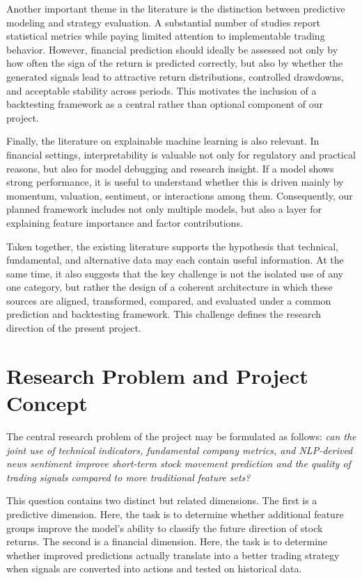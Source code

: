 \documentclass[12pt,a4paper]{article}
\begin{document}
Another important theme in the literature is the distinction between predictive modeling and strategy evaluation. A substantial number of studies report statistical metrics while paying limited attention to implementable trading behavior. However, financial prediction should ideally be assessed not only by how often the sign of the return is predicted correctly, but also by whether the generated signals lead to attractive return distributions, controlled drawdowns, and acceptable stability across periods. This motivates the inclusion of a backtesting framework as a central rather than optional component of our project.

Finally, the literature on explainable machine learning is also relevant. In financial settings, interpretability is valuable not only for regulatory and practical reasons, but also for model debugging and research insight. If a model shows strong performance, it is useful to understand whether this is driven mainly by momentum, valuation, sentiment, or interactions among them. Consequently, our planned framework includes not only multiple models, but also a layer for explaining feature importance and factor contributions.

Taken together, the existing literature supports the hypothesis that technical, fundamental, and alternative data may each contain useful information. At the same time, it also suggests that the key challenge is not the isolated use of any one category, but rather the design of a coherent architecture in which these sources are aligned, transformed, compared, and evaluated under a common prediction and backtesting framework. This challenge defines the research direction of the present project.

\section{Research Problem and Project Concept}

The central research problem of the project may be formulated as follows: \textit{can the joint use of technical indicators, fundamental company metrics, and NLP-derived news sentiment improve short-term stock movement prediction and the quality of trading signals compared to more traditional feature sets?}

This question contains two distinct but related dimensions. The first is a predictive dimension. Here, the task is to determine whether additional feature groups improve the model's ability to classify the future direction of stock returns. The second is a financial dimension. Here, the task is to determine whether improved predictions actually translate into a better trading strategy when signals are converted into actions and tested on historical data.
\end{document}
